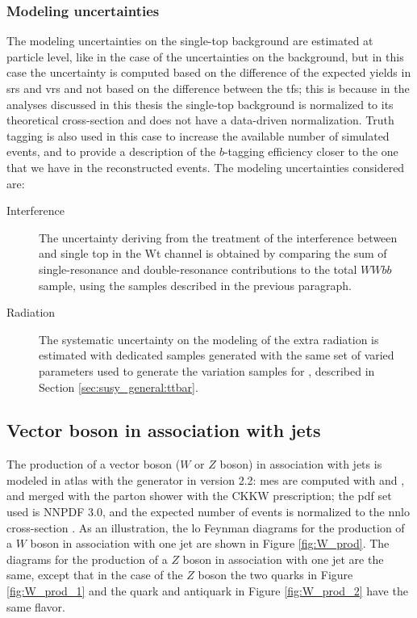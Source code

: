 \subsubsection*{Modeling uncertainties}

The modeling uncertainties on the single-top background are estimated at particle level, 
like in the case of the uncertainties on the \ttbar background, but in this case the uncertainty is computed based on the difference of the expected yields in \glspl{sr} and \glspl{vr} and not based on the difference between the \glspl{tf}; 
this is because in the analyses discussed in this thesis the single-top background is normalized to its theoretical cross-section and does not have a data-driven normalization. Truth tagging is also used in this case to 
increase the available number of simulated events,  
and to provide a description of the $b$-tagging efficiency closer to the one that we have in the reconstructed events. The modeling uncertainties considered are: 

\begin{description}
\item[Interference] The uncertainty deriving from the treatment of the interference between \ttbar and single top in the Wt channel is obtained by  comparing the sum of single-resonance and double-resonance contributions to the total $WWbb$ sample, using the samples described in the previous paragraph.

\item[Radiation] The systematic uncertainty on the modeling of the extra radiation is estimated with dedicated samples generated with the same set of varied parameters used to generate the variation samples for \ttbar, described in Section \ref{sec:susy_general:ttbar}. 

\end{description}

\subsection{Vector boson in association with jets}

The production of a vector boson ($W$ or $Z$ boson) in association with jets is modeled in \gls{atlas} with the \Sherpa generator in version 2.2: \glspl{me} are 
computed with \comix \cite{Gleisberg:2008fv} and \OL \cite{Cascioli:2011va}, and merged with the \Sherpa parton shower with the CKKW prescription; the \gls{pdf} set used is NNPDF 3.0, and the expected number of events is normalized to the \gls{nnlo} cross-section \cite{Catani:2009sm}.
As an illustration, the \gls{lo} Feynman diagrams for the production of a $W$ boson in association with one jet are shown in Figure \ref{fig:W_prod}. 
The diagrams for the production of a $Z$ boson in association with one jet are the same, except that in the case of the $Z$ boson the 
two quarks in Figure \ref{fig:W_prod_1} and the quark and antiquark in Figure \ref{fig:W_prod_2} have the same flavor. 

